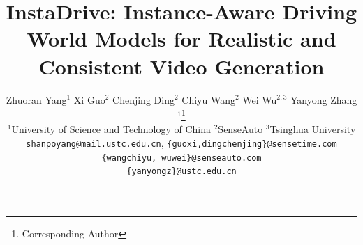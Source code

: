 \documentclass[10pt,twocolumn,letterpaper]{article}
\title{InstaDrive: Instance-Aware Driving World Models for Realistic and Consistent Video Generation}
\author{
Zhuoran Yang$^{1}$\hspace{0.8em}
Xi Guo$^{2}$\hspace{0.8em}
Chenjing Ding$^{2}$ \hspace{1em}
Chiyu Wang$^2$\hspace{0.8em}
Wei Wu$^{2,3}$
Yanyong Zhang$^{1}$\thanks{Corresponding Author}
\\
{
 \normalsize  $^1$University of Science and Technology of China}  \enspace
 \normalsize $^2$SenseAuto \enspace \normalsize $^3$Tsinghua University \\
{{\tt\small shanpoyang@mail.ustc.edu.cn}, \enspace \tt\small \{guoxi,dingchenjing\}@sensetime.com}  \\
{\tt\small \{wangchiyu, wuwei\}@senseauto.com} \\
{\tt\small \{yanyongz\}@ustc.edu.cn} \\
}
\begin{document}
\maketitle
    






%



{
    \small
    
    
}
\end{document}
